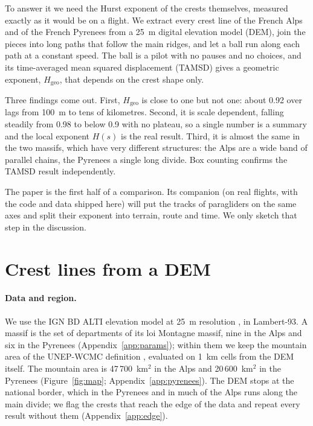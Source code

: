 \documentclass[11pt,a4paper]{article}
\newcommand{\Hgeo}{H_{\mathrm{geo}}}
\begin{document}
To answer it we need the Hurst exponent of the crests themselves, measured
exactly as it would be on a flight. We extract every crest line of the French
Alps and of the French Pyrenees from a 25~m digital elevation model (DEM),
join the pieces into long paths that follow the main ridges, and let a ball
run along each path at a constant speed. The ball is a pilot with no pauses
and no choices, and its time-averaged mean squared displacement (TAMSD) gives
a geometric exponent, $\Hgeo$, that depends on the crest shape only.

Three findings come out. First, $\Hgeo$ is close to one but not one: about 0.92
over lags from 100~m to tens of kilometres. Second, it is scale dependent,
falling steadily from 0.98 to below 0.9 with no plateau, so a single number is
a summary and the local exponent $H(s)$ is the real result. Third, it is almost
the same in the two massifs, which have very different structures: the Alps
are a wide band of parallel chains, the Pyrenees a single long divide.
Box counting confirms the TAMSD result independently.

The paper is the first half of a comparison. Its companion (on real flights,
with the code and data shipped here) will put the tracks of paragliders on the
same axes and split their exponent into terrain, route and time. We only
sketch that step in the discussion.

\section{Crest lines from a DEM}
\label{sec:crests}

\paragraph{Data and region.}
We use the IGN BD ALTI elevation model at 25~m resolution \citep{ign_bdalti},
in Lambert-93. A massif is the set of departments of its loi Montagne massif,
nine in the Alps and six in the Pyrenees (Appendix~\ref{app:params}); within
them we keep the mountain area of the UNEP-WCMC definition \citep{kapos2000},
evaluated on 1~km cells from the DEM itself. The mountain area is
47\,700~km$^2$ in the Alps and 20\,600~km$^2$ in the Pyrenees
(Figure~\ref{fig:map}; Appendix~\ref{app:pyrenees}). The DEM stops at the
national border, which in the Pyrenees and in much of the Alps runs along the
main divide; we flag the crests that reach the edge of the data and repeat
every result without them (Appendix~\ref{app:edge}).
\end{document}
